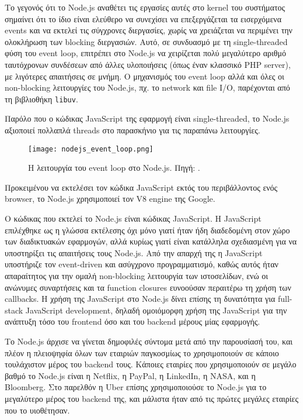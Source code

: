 \documentclass[../thesis.tex]{subfiles}
\begin{document}
Το γεγονός ότι το Node.js αναθέτει τις εργασίες αυτές στο kernel του συστήματος σημαίνει ότι το ίδιο είναι ελεύθερο να συνεχίσει να επεξεργάζεται τα εισερχόμενα events και να εκτελεί τις σύγχρονες διεργασίες, χωρίς να χρειάζεται να περιμένει την ολοκλήρωση των blocking διεργασιών.
Αυτό, σε συνδυασμό με τη single-threaded φύση του event loop, επιτρέπει στο Node.js να χειρίζεται πολύ μεγαλύτερο αριθμό ταυτόχρονων συνδέσεων από άλλες υλοποιήσεις (όπως έναν κλασσικό PHP server), με λιγότερες απαιτήσεις σε μνήμη.
Ο μηχανισμός του event loop αλλά και όλες οι non-blocking λειτουργίες του Node.js, πχ. το network και file I/O, παρέχονται από τη βιβλιοθήκη \texttt{libuv}.

Παρόλο που ο κώδικας JavaScript της εφαρμογή είναι single-threaded, το Node.js αξιοποιεί πολλαπλά threads στο παρασκήνιο για τις παραπάνω λειτουργίες.

\begin{figure}
    \texttt{[image: nodejs\_event\_loop.png]}
    \centering
    \caption{Η λειτουργία του event loop στο Node.js. Πηγή: \cite{node_eventloop_diagram}.}
\end{figure}

\bigskip

Προκειμένου να εκτελέσει τον κώδικα JavaScript εκτός του περιβάλλοντος ενός browser, το Node.js χρησιμοποιεί τον V8 engine της Google.

Ο κώδικας που εκτελεί το Node.js είναι κώδικας JavaScript.
Η JavaScript επιλέχθηκε ως η γλώσσα εκτέλεσης όχι μόνο γιατί ήταν ήδη διαδεδομένη στον χώρο των διαδικτυακών εφαρμογών, αλλά κυρίως γιατί είναι κατάλληλα σχεδιασμένη για να υποστηρίξει τις απαιτήσεις τους Node.js.
Από την απαρχή της η JavaScript υποστήριζε τον event-driven και ασύγχρονο προγραμματισμό, καθώς αυτός ήταν απαραίτητος για την ομαλή non-blocking λειτουργία των ιστοσελίδων, ενώ οι ανώνυμες συναρτήσεις και τα function closures ευνοούσαν περαιτέρω τη χρήση των callbacks.
Η χρήση της JavaScript στο Node.js δίνει επίσης τη δυνατότητα για full-stack JavaScript development, δηλαδή ομοιόμορφη χρήση της JavaScript για την ανάπτυξη τόσο του frontend όσο και του backend μέρους μίας εφαρμογής.

\bigskip

Το Node.js άρχισε να γίνεται δημοφιλές σύντομα μετά από την παρουσίασή του, και πλέον η πλειοψηφία όλων των εταιριών παγκοσμίως το χρησιμοποιούν σε κάποιο τουλάχιστον μέρος του backend τους.
Κάποιες εταιρίες που χρησιμοποιούν σε μεγάλο βαθμό το Node.js είναι η Netflix\cite{netflix}, η PayPal\cite{paypal}, η LinkedIn\cite{linkedIn}, η NASA\cite{nasa}, και η Bloomberg\cite{bloomberg}.
Στο παρελθόν η Uber επίσης χρησιμοποιούσε το Node.js για το μεγαλύτερο μέρος του backend της, και μάλιστα ήταν από τις πρώτες μεγάλες εταιρίες που το υιοθέτησαν\cite{uberNode}.
\end{document}
